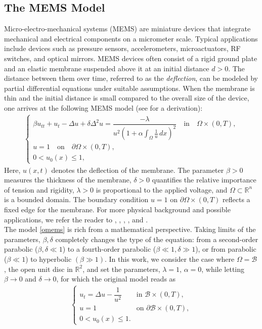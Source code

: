 \documentclass[11pt,reqno]{amsart}
\theoremstyle{definition}
\theoremstyle{bfremark}
\numberwithin{equation}{section}
\begin{document}
\subsection{The MEMS Model}
Micro-electro-mechanical systems (MEMS) are miniature devices that integrate mechanical and electrical components on a micrometer scale. Typical applications include devices such as pressure sensors, accelerometers, microactuators, RF switches, and optical mirrors. MEMS devices often consist of a rigid ground plate and an elastic membrane suspended above it at an initial distance \( d > 0 \). The distance between them over time, referred to as the \emph{deflection}, can be modeled by partial differential equations under suitable assumptions. When the membrane is thin and the initial distance is small compared to the overall size of the device, one arrives at the following MEMS model (see \cite{kavallaris2018non} for a derivation):
\begin{align}
\begin{cases}
    \beta u_{tt} + u_t - \Delta u + \delta \Delta^2 u = \dfrac{-\lambda}{u^2 \left(1 + \alpha \int_{\Omega} \frac{1}{u} \, dx \right)^2} \quad \text{in} \quad \Omega \times (0,T), \\
    u = 1 \quad \text{on} \quad \partial\Omega \times (0,T), \\
    0<u_0(x) \leq 1,\label{omems}
\end{cases}
\end{align}
Here, \( u(x,t) \) denotes the deflection of the membrane. The parameter \(\beta>0\) measures the thickness of the membrane, \( \delta > 0 \) quantifies the relative importance of tension and rigidity, \( \lambda > 0 \) is proportional to the applied voltage, and \( \Omega \subset \mathbb{R}^n \) is a bounded domain. The boundary condition \( u = 1 \text{ on } \partial \Omega \times (0, T)\) reflects a fixed edge for the membrane. For more physical background and possible applications, we refer the reader to \cite{guo2005touchdown}, \cite{esposito2010mathematical}, \cite{flores2007analysis}, \cite{guo2014recent}, and \cite{pelesko2002modeling}.   \\

The model \ref{omems} is rich from a mathematical perspective. Taking limits of the parameters, \(\beta, \delta\) completely changes the type of the equation: from a second-order parabolic (\(\beta, \delta \ll1\)) to a
fourth-order parabolic (\(\beta \ll1, \delta \gg 1\)), or from parabolic (\(\beta \ll 1\)) to hyperbolic \((\beta \gg 1)\). In this work, we consider the case where \( \Omega = \mathcal{B} \), the open unit disc in \( \mathbb{R}^2 \), and set the parameters, \(\lambda = 1\), \(\alpha = 0\), while letting \(\beta \to 0\) and \(\delta \to 0\), for which the original model reads as
\begin{align}
\begin{cases}
    u_t = \Delta u - \dfrac{1}{u^2} & \text{in } \mathcal{B} \times (0, T), \\
    u = 1 & \text{on } \partial\mathcal{B} \times (0, T), \\
    0 < u_0(x) \leq 1. & \label{mems}
\end{cases}
\end{align}
\end{document}

